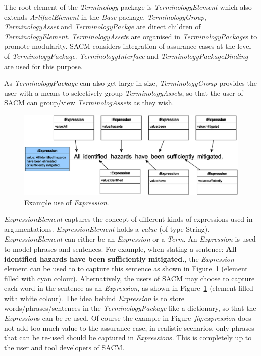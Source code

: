 The root element of the \textit{Terminology} package is \textit{TerminologyElement} which also extends \textit{ArtifactElement} in the \textit{Base} package. \textit{TerminologyGroup}, \textit{TerminologyAsset} and \textit{TerminologyPackge} are direct children of \textit{TerminologyElement}. \textit{TerminologyAsset}s are organised in \textit{TerminologyPackage}s to promote modularity. SACM considers integration of assurance cases at the level of \textit{TerminologyPackage}. \textit{TerminologyInterface} and \textit{TerminologyPackageBinding} are used for this purpose.

As \textit{TerminologyPackage} can also get large in size, \textit{TerminologyGroup} provides the user with a means to selectively group \textit{TerminologyAsset}s, so that the user of SACM can group/view \textit{TerminologAsset}s as they wish.

\begin{figure}
	\centering
	\includegraphics[width=1\linewidth]{fig/expression.eps}
	\caption{Example use of \textit{Expression}.}
	\label{fig:expression}
\end{figure}

\textit{ExpressionElement} captures the concept of different kinds of expressions used in argumentations. \textit{ExpressionElement} holds a \textit{value} (of type String). \textit{ExpressionElement} can either be an \textit{Expression} or a \textit{Term}. An \textit{Expression} is used to model phrases and sentences. For example, when stating a sentence: \textbf{All identified hazards have been sufficiently mitigated.}, the \textit{Expression} element can be used to to capture this sentence as shown in Figure~\ref{fig:expression} (element filled with cyan colour). Alternatively, the users of SACM may choose to capture each word in the sentence as an \textit{Expression}, as shown in Figure~\ref{fig:expression} (element filled with white colour). The idea behind \textit{Expression} is to store words/phrases/sentences in the \textit{TerminologyPackage} like a dictionary, so that the \textit{Expression}s can be re-used. Of course the example in Figure~\textit{fig:expression} does not add too much value to the assurance case, in realistic scenarios, only phrases that can be re-used should be captured in \textit{Expression}s. This is completely up to the user and tool developers of SACM. 

